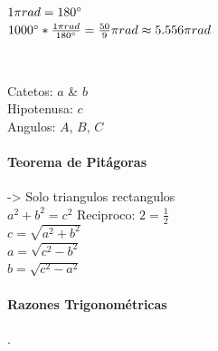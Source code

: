 \documentclass[stu, 12pt, letterpaper, donotrepeattitle, floatsintext, natbib]{apa7}
\begin{document}
    $1\pi{rad} = 180\degree$\\
    $1000\degree * \frac{1\pi{rad}}{180\degree} = \frac{50}{9}\pi{rad} \approx 5.556\pi{rad}$

    \newpage

    \begin{paracol}{2}
         \\

        \switchcolumn

        Catetos: $a$ \& $b$ \\
        Hipotenusa: $c$ \\
        Angulos: $A$, $B$, $C$
    \end{paracol}

    \paragraph{Teorema de Pitágoras} -> Solo triangulos rectangulos\\
    $a^2+b^2=c^2$ \hspace{8cm} Reciproco: $2=\frac{1}{2}$\\
    $c=\sqrt{a^2+b^2}$\\
    $a=\sqrt{c^2-b^2}$\\
    $b=\sqrt{c^2-a^2}$

    \paragraph{Razones Trigonométricas}.\\[0.5cm]

    \newcommand{\sinA}{$\displaystyle \sin(A) = \frac{C.O}{HIP} \textcolor{blue}{= \frac{a}{c}}$}
    \newcommand{\cosA}{$\displaystyle \cos(A) = \frac{C.A}{HIP} \textcolor{blue}{=\frac{b}{c}}$}
    \newcommand{\tanA}{$\displaystyle \tan(A) = \frac{C.O}{C.A} \textcolor{blue}{=\frac{a}{b}}$}
    \newcommand{\cotA}{$\displaystyle \cot(A) \textcolor{red}{=\frac{b}{a}}$}
    \newcommand{\secA}{$\displaystyle \sec(A) \textcolor{red}{=\frac{c}{b}}$}
    \newcommand{\cscA}{$\displaystyle \csc(A) \textcolor{red}{=\frac{c}{a}}$}
\end{document}
